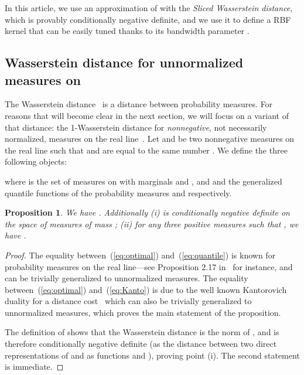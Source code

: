 \documentclass[11pt]{article}
\newtheorem{prop}[thm]{Proposition}
\begin{document}
In this article, we use an approximation of  with the {\em Sliced Wasserstein distance}, which is provably 
conditionally negative definite, and we use it to define a RBF kernel that can be easily tuned thanks to its bandwidth parameter .



\subsection{Wasserstein distance for unnormalized measures on }
\label{sec:wasserstein}
The Wasserstein distance~\cite[\S6]{Villani09} is a distance between probability measures. 
For reasons that will become clear in the next section, we will focus on a variant of that distance: 
the 1-Wasserstein distance for \emph{nonnegative}, not necessarily normalized, measures on the real line~\cite[\S2]{Santambrogio15}. 
Let  and  be two nonnegative measures on the real line such that 
 and  are equal to the same number . 
We define the three following objects:


where  is the set of measures on  with marginals  and , 
and  and  the generalized quantile functions of the probability measures  and  respectively. 

\begin{prop}
We have . 
Additionally 
\emph{(i)}  is conditionally negative definite on the space of measures of mass ; 
\emph{(ii)} for any three positive measures  such that , 
we have .
\end{prop}


\begin{proof} The equality between~(\ref{eq:optimal}) and~(\ref{eq:quantile}) is known for probability measures on the 
real line---see Proposition 2.17 in~\cite{Santambrogio15} for instance, and can be trivially generalized to unnormalized measures. 
The equality between~(\ref{eq:optimal}) and~(\ref{eq:Kanto}) is due to the well known Kantorovich duality for a distance 
cost~\cite[Particular case 5.4]{Villani09} which can also be trivially generalized to unnormalized measures, 
which proves the main statement of the proposition. 

The definition of  shows that the Wasserstein distance 
is the  norm of , and is therefore conditionally negative definite (as the  distance 
between two direct representations of  and  as functions  and ), proving point (i). 
The second statement is immediate.
\end{proof}
\end{document}
